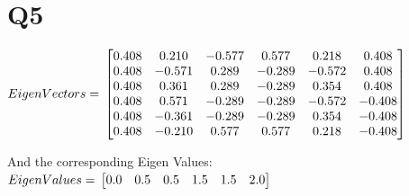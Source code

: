 \documentclass{article}
\begin{document}
\section*{Q5}
$Eigen Vectors =  \\
\begin{bmatrix}
  0.408 & 0.210 & -0.577 & 0.577 & 0.218 & 0.408 \\
  0.408 & -0.571 & 0.289 & -0.289 & -0.572 & 0.408 \\
  0.408 & 0.361 & 0.289 & -0.289 & 0.354 & 0.408 \\
  0.408 & 0.571 & -0.289 & -0.289 & -0.572 & -0.408 \\
  0.408 & -0.361 & -0.289 & -0.289 & 0.354 & -0.408 \\
  0.408 & -0.210 & 0.577 & 0.577 & 0.218 & -0.408
\end{bmatrix}$

And the corresponding Eigen Values:
$Eigen Values = \\
\begin{bmatrix}
  0.0 & 0.5 & 0.5 & 1.5 & 1.5 & 2.0
\end{bmatrix}
$
\end{document}
